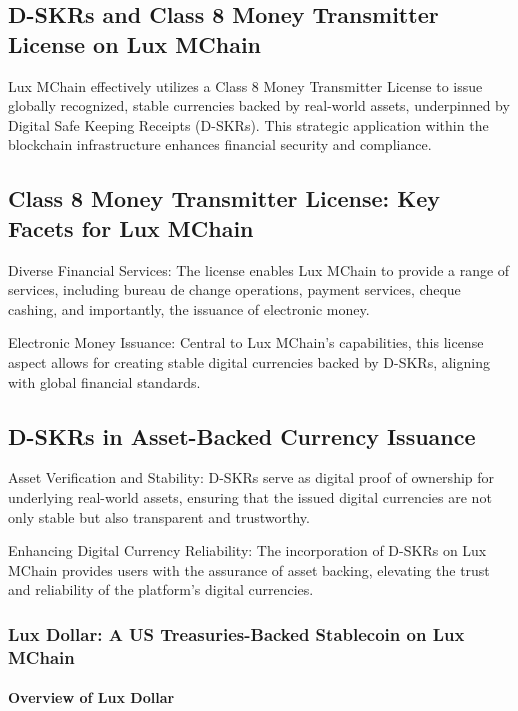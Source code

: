 \documentclass[11pt]{article}
\begin{document}
\subsection{D-SKRs and Class 8 Money Transmitter License on Lux MChain}

Lux MChain effectively utilizes a Class 8 Money Transmitter License to issue globally recognized, stable currencies backed by real-world assets, underpinned by Digital Safe Keeping Receipts (D-SKRs). This strategic application within the blockchain infrastructure enhances financial security and compliance.


\subsection{Class 8 Money Transmitter License: Key Facets for Lux MChain}

Diverse Financial Services: The license enables Lux MChain to provide a range of services, including bureau de change operations, payment services, cheque cashing, and importantly, the issuance of electronic money​​.


Electronic Money Issuance: Central to Lux MChain's capabilities, this license aspect allows for creating stable digital currencies backed by D-SKRs, aligning with global financial standards.


\subsection{D-SKRs in Asset-Backed Currency Issuance}

Asset Verification and Stability: D-SKRs serve as digital proof of ownership for underlying real-world assets, ensuring that the issued digital currencies are not only stable but also transparent and trustworthy.


Enhancing Digital Currency Reliability: The incorporation of D-SKRs on Lux MChain provides users with the assurance of asset backing, elevating the trust and reliability of the platform's digital currencies.


\subsubsection{Lux Dollar: A US Treasuries-Backed Stablecoin on Lux MChain}

\paragraph{Overview of Lux Dollar}
\end{document}
